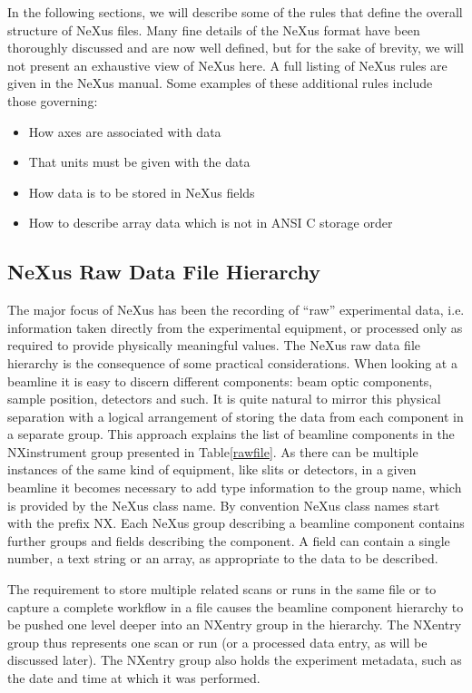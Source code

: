 \documentclass[%
 aip,
rsi,
 amsmath,amssymb,
 reprint,%
]{revtex4-1}
\begin{document}
In the following sections, we will describe some of the rules that define the overall structure of NeXus files. Many fine details 
of the NeXus format have been thoroughly discussed and are now well defined, but for the sake of brevity, we will not present an 
exhaustive view of NeXus here. A full listing of NeXus rules are given in the NeXus manual\cite{nxman}. Some examples of these 
additional rules include those governing:
\begin{itemize}
\item How axes are associated with data
\item That units must be given with the data
\item How data is to be stored in NeXus fields
\item How to describe array data which is not in ANSI C storage order
\end{itemize}



\subsection{NeXus Raw Data File Hierarchy}
The major focus of NeXus has been the recording of ``raw'' experimental data, i.e. information taken directly from the experimental 
equipment, or processed only as required to provide physically meaningful values.
The NeXus raw data file hierarchy is the consequence of some practical considerations. When looking at a beamline it is easy to 
discern different components: beam optic components, sample position, detectors and such. It is quite natural to mirror this physical 
separation with a logical arrangement of storing the data from each component in a separate group. This approach explains the 
list of beamline components in the NXinstrument group presented in Table\ref{rawfile}. 
As there can be multiple instances of the same kind of equipment, like slits or detectors, in a given beamline it becomes necessary
to add type information to the group name, which is provided by the NeXus class name. By convention NeXus class names start 
with the prefix NX. Each NeXus group describing a beamline component contains further groups and fields describing the component. 
A field can contain a single number, a text string or an array, as appropriate to the data to be described.  

The requirement to store multiple related scans or runs  in the same file or to capture 
a complete workflow in a file causes the beamline component hierarchy to be pushed one level deeper into an NXentry 
group in the hierarchy. The NXentry  group thus represents one scan or run (or a processed data entry, as will be discussed later). 
The NXentry group also holds the experiment metadata, such as the date and time at which it was performed. 
\end{document}
